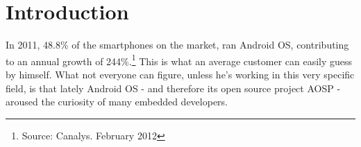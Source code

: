 \section{Introduction}
In 2011, 48.8\% of the smartphones on the market, ran Android OS, contributing to an annual growth of 244\%.\footnote{Source: Canalys. February 2012} This is what an average customer can easily guess by himself. What not everyone can figure, unless he's working in this very specific field, is that lately Android OS - and therefore its open source project AOSP - aroused the curiosity of many embedded developers.\\
